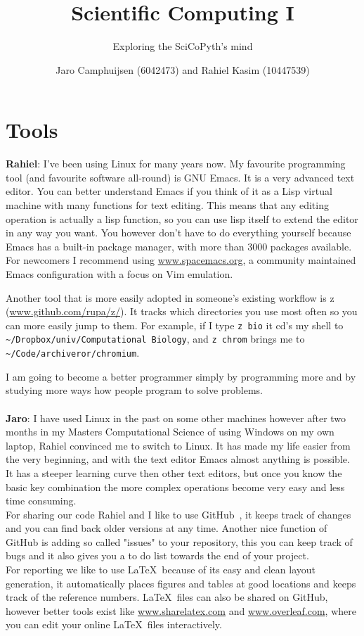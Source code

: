 \documentclass[a4paper]{article}
\author{Jaro Camphuijsen (6042473) and Rahiel Kasim (10447539)}
\title{Scientific Computing I}
\subtitle{Exploring the SciCoPyth's mind}
\begin{document}
\maketitle

\tableofcontents

\section{Tools}
\textbf{Rahiel}: I've been using Linux for many years now. My favourite programming tool (and favourite software all-round) is GNU Emacs. It is a very advanced text editor. You can better understand Emacs if you think of it as a Lisp virtual machine with many functions for text editing. This means that any editing operation is actually a lisp function, so you can use lisp itself to extend the editor in any way you want. You however don't have to do everything yourself because Emacs has a built-in package manager, with more than 3000 packages available. For newcomers I recommend using \url{www.spacemacs.org}, a community maintained Emacs configuration with a focus on Vim emulation. 

Another tool that is more easily adopted in someone's existing workflow is z (\url{www.github.com/rupa/z/}). It tracks which directories you use most often so you can more easily jump to them. For example, if I type \texttt{z bio} it cd's my shell to \texttt{\~{}/Dropbox/univ/Computational Biology}, and \texttt{z chrom} brings me to \texttt{\~{}/Code/archiveror/chromium}.

I am going to become a better programmer simply by programming more and by studying more ways how people program to solve problems.
\\ \\
\noindent
\textbf{Jaro}: I have used Linux in the past on some other machines however after two months in my Masters Computational Science of using Windows on my own laptop, Rahiel convinced me to switch to Linux. It has made my life easier from the very beginning, and with the text editor Emacs almost anything is possible. It has a steeper learning curve then other text editors, but once you know the basic key combination the more complex operations become very easy and less time consuming. \\
For sharing our code Rahiel and I like to use GitHub~\cite{sunsistemoGH}, it keeps track of changes and you can find back older versions at any time. Another nice function of GitHub is adding so called "issues" to your repository, this you can keep track of bugs and it also gives you a to do list towards the end of your project. \\
For reporting we like to use \LaTeX \ because of its easy and clean layout generation, it automatically places figures and tables at good locations and keeps track of the reference numbers. \LaTeX \  files can also be shared on GitHub, however better tools exist like \url{www.sharelatex.com} and \url{www.overleaf.com}, where you can edit your online \LaTeX \ files interactively. 
\end{document}
